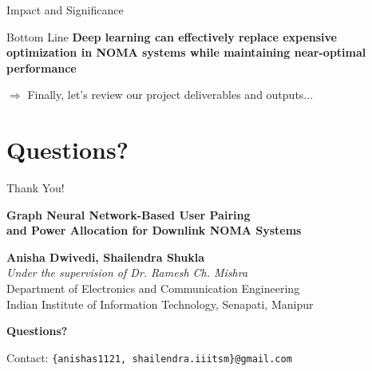 \documentclass[aspectratio=169]{beamer}
\begin{document}
\begin{frame}{Impact and Significance}
    
    \begin{exampleblock}{Bottom Line}
        \textbf{Deep learning can effectively replace expensive optimization in NOMA systems while maintaining near-optimal performance}
    \end{exampleblock}
    
    \vspace{0.2cm}
    \small \textcolor{iiitblue}{$\Rightarrow$ Finally, let's review our project deliverables and outputs...}
\end{frame}



\section{Questions?}

\begin{frame}{Thank You!}
    \begin{center}
        \Large \textbf{Graph Neural Network-Based User Pairing\\and Power Allocation for Downlink NOMA Systems}
        
        \vspace{1cm}
        
        \normalsize
        \textbf{Anisha Dwivedi, Shailendra Shukla}\\
        \textit{Under the supervision of Dr. Ramesh Ch. Mishra}\\[0.3cm]
        Department of Electronics and Communication Engineering\\
        Indian Institute of Information Technology, Senapati, Manipur
        
        \vspace{1cm}
        
        \Large \textbf{Questions?}
        
        \vspace{0.5cm}
        
        \normalsize
        Contact: \texttt{\{anishas1121, shailendra.iiitsm\}@gmail.com}
    \end{center}
\end{frame}
\end{document}
